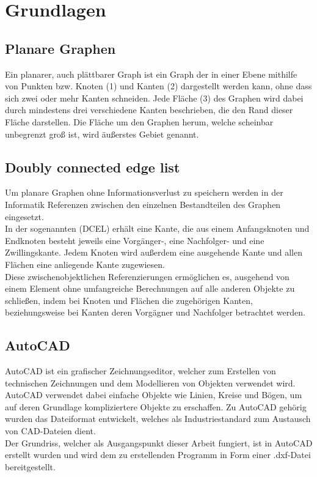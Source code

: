 \chapter{Grundlagen}
\section{Planare Graphen}
Ein planarer, auch plättbarer Graph ist ein Graph der in einer Ebene mithilfe von Punkten bzw. Knoten (1) und Kanten (2) dargestellt werden kann, ohne dass sich zwei oder mehr Kanten schneiden. 
Jede Fläche (3) des Graphen wird dabei durch mindestens drei verschiedene Kanten beschrieben, die den Rand dieser Fläche darstellen. 
Die Fläche um den Graphen herum, welche scheinbar unbegrenzt groß ist, wird äußerstes Gebiet genannt.
\section{Doubly connected edge list}
Um planare Graphen ohne Informationsverlust zu speichern werden in der Informatik Referenzen zwischen den einzelnen Bestandteilen des Graphen eingesetzt. \\
In der sogenannten  (DCEL) erhält eine Kante, die aus einem Anfangsknoten und Endknoten besteht jeweils eine Vorgänger-, eine Nachfolger- und eine Zwillingskante. 
Jedem Knoten wird außerdem eine ausgehende Kante und allen Flächen eine anliegende Kante zugewiesen. \\
Diese zwischenobjektlichen Referenzierungen ermöglichen es, ausgehend von einem Element ohne umfangreiche Berechnungen auf alle anderen Objekte zu schließen, indem bei Knoten und Flächen die zugehörigen Kanten, beziehungsweise bei Kanten deren Vorgägner und Nachfolger betrachtet werden.
\section{AutoCAD}
AutoCAD ist ein grafischer Zeichnungseditor, welcher zum Erstellen von technischen Zeichnungen und dem Modellieren von Objekten verwendet wird.
AutoCAD verwendet dabei einfache Objekte wie Linien, Kreise und Bögen, um auf deren Grundlage kompliziertere Objekte zu erschaffen.
Zu AutoCAD gehörig wurden das Dateiformat  entwickelt, welches als Industriestandard zum Austausch von CAD-Dateien dient. \\
Der Grundriss, welcher als Ausgangspunkt dieser Arbeit fungiert, ist in AutoCAD erstellt wurden und wird dem zu erstellenden Programm in Form einer .dxf-Datei bereitgestellt.
